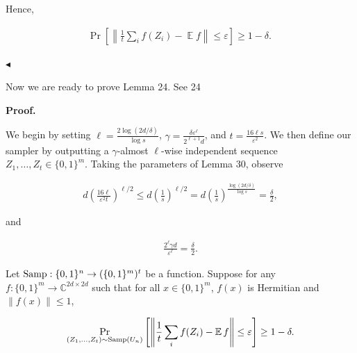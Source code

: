 \documentclass[10pt,a4paper]{article}
\begin{document}
Hence,\par


\[\begin{gathered}
\Pr\left[\left\lVert\frac{1}{t}\sum_{i}f(Z_{i})-\operatorname*{\mathbb{E}}f\right\rVert\leq\varepsilon\right]\geq 1-\delta.\
\end{gathered}\]


$\blacktriangleleft$\par




Now we are ready to prove Lemma 24.
See 24\par





\par\medskip\noindent\textbf{Proof.}\par




We begin by setting $\ell=\frac{2\log(2d/\delta)}{\log s}$, $\gamma=\frac{\delta\varepsilon^{\ell}}{2^{\ell+1}d}$, and $t=\frac{16\ell s}{\varepsilon^{2}}$. We then define our sampler by outputting a $\gamma$-almost $\ell$-wise independent sequence $Z_{1},\dots,Z_{t}\in\{0,1\}^{m}$.
Taking the parameters of Lemma 30, observe\par


\[\begin{gathered}
d\left(\frac{16\ell}{\varepsilon^{2}t}\right)^{\ell/2}\leq d\left(\frac{1}{{s}}\right)^{\ell/2}=d\left(\frac{1}{{s}}\right)^{\frac{\log(2d/\delta)}{\log s}}=\frac{\delta}{2},
\end{gathered}\]


and\par


\[\begin{gathered}
\frac{2^{\ell}\gamma d}{\varepsilon^{\ell}}=\frac{\delta}{2}.
\end{gathered}\]




Let $\textup{{Samp}}:\{0,1\}^{n}\to(\{0,1\}^{m})^{t}$ be a function. Suppose for any $f:\{0,1\}^{m}\to\mathbb{C}^{2d\times 2d}$ such that for all $x\in\{0,1\}^{m}$, $f(x)$ is Hermitian and $\|f(x)\|\leq 1$,\par


\[\begin{gathered}
\Pr_{(Z_{1},\dots,Z_{t})\sim\textup{{Samp}}(U_{n})}\left[\left\lVert\frac{1}{t}\sum_{i}f(Z_{i})-\operatorname*{\mathbb{E}}f\right\rVert\leq\varepsilon\right]\geq 1-\delta.
\end{gathered}\]
\end{document}
